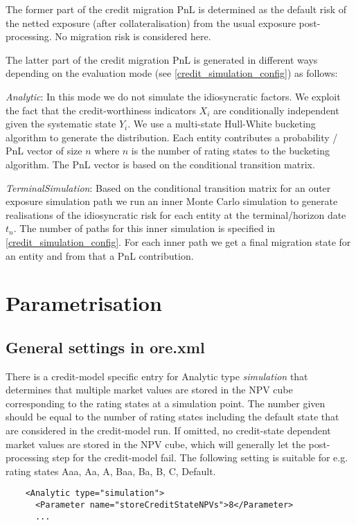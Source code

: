\documentclass[12pt, a4paper]{article}
\begin{document}
The former part of the credit migration PnL is determined as the default risk of the netted exposure (after
collateralisation) from the usual exposure post-processing. No migration risk is considered here.

The latter part of the credit migration PnL is generated in different ways depending on the evaluation mode (see
\ref{credit_simulation_config}) as follows:

{\em Analytic}: In this mode we do not simulate the idiosyncratic factors.  We exploit the fact that the credit-worthiness indicators $X_i$ are conditionally independent given the
systematic state $Y_i$. We use a multi-state Hull-White bucketing algorithm to generate the distribution. Each entity
contributes a probability / PnL vector of size $n$ where $n$ is the number of rating states to the bucketing
algorithm. The PnL vector is based on the conditional transition matrix.

{\em TerminalSimulation}: Based on the conditional transition matrix for an outer exposure simulation path we run an
inner Monte Carlo simulation to generate realisations of the idiosyncratic risk for each entity at the terminal/horizon
date $t_n$. The number of paths for this inner simulation is specified in \ref{credit_simulation_config}. For each inner
path we get a final migration state for an entity and from that a PnL contribution.

\section{Parametrisation}

\subsection{General settings in ore.xml}\label{general_settings}

There is a credit-model specific entry for Analytic type {\em simulation} that determines that multiple market values
are stored in the NPV cube corresponding to the rating states at a simulation point. The number given should be equal to
the number of rating states including the default state that are considered in the credit-model run. If omitted, no
credit-state dependent market values are stored in the NPV cube, which will generally let the post-processing step for
the credit-model fail. The following setting is suitable for e.g. rating states Aaa, Aa, A, Baa, Ba, B, C, Default.

\begin{verbatim}
    <Analytic type="simulation">
      <Parameter name="storeCreditStateNPVs">8</Parameter>
      ...
\end{verbatim}
\end{document}
